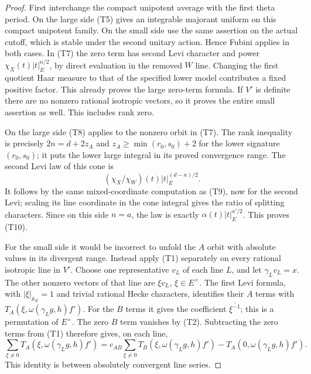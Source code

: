 \begin{proof}
First interchange the compact unipotent average with the first
theta period. On the large side (T5) gives an integrable majorant
uniform on this compact unipotent family. On the small side use the
same assertion on the actual cutoff, which is stable under the
second unitary action. Hence Fubini applies in both cases.
In (T7) the zero term has second Levi character and power
\(\chi_X(t)|t|_E^{n/2}\), by direct evaluation in the removed
\(W\) line. Changing the first quotient Haar measure to that of the
specified lower model contributes a fixed positive factor. This
already proves the large zero-term formula. If \(V'\) is definite
there are no nonzero rational isotropic vectors, so it proves the
entire small assertion as well. This includes rank zero.

On the large side (T8) applies to the nonzero orbit in (T7).
The rank inequality is precisely
\(2n=d+2z_A\) and
\(z_A\ge\min(r_0,s_0)+2\) for the lower signature \((r_0,s_0)\);
it puts the lower large integral in its proved convergence range.
The second Levi law of this cone is
\[
       (\chi_X/\chi_W)(t)|t|_E^{(d-n)/2}.
 \tag{T12}\label{eq:sr-theta-cone-second-law}
\]
It follows by the same mixed-coordinate computation as (T9), now
for the second Levi; scaling its line coordinate in the cone integral
gives the ratio of splitting characters. Since on this side
\(n=a\), the law is exactly
\(\alpha(t)|t|_E^{a'/2}\). This proves (T10).

For the small side it would be incorrect to unfold the \(A\) orbit
with absolute values in its divergent range. Instead apply (T1)
separately on every rational isotropic line in \(V'\).
Choose one representative \(v_L\) of each line \(L\), and let
\(\gamma_Lv_L=x\). The other nonzero vectors of that line are
\(\xi v_L\), \(\xi\in E^\times\). The first Levi formula, with
\(|\xi|_{\mathbb A_E}=1\) and trivial rational Hecke characters,
identifies their \(A\) terms with
\(T_A(\xi,\omega(\gamma_Lg,h)f')\).
For the \(B\) terms it gives the coefficient
\(\overline{\xi^{-1}}\); this is a permutation of \(E^\times\).
The zero \(B\) term vanishes by (T2).
Subtracting the zero terms from (T1) therefore gives, on each line,
\[
 \sum_{\xi\ne0}T_A(\xi,\omega(\gamma_Lg,h)f')
   =c_{AB}\sum_{\xi\ne0}
          T_B(\xi,\omega(\gamma_Lg,h)f')
                -T_A(0,\omega(\gamma_Lg,h)f').
 \tag{T13}\label{eq:sr-theta-small-paired-orbits}
\]
This identity is between absolutely convergent line series.


\end{proof}
